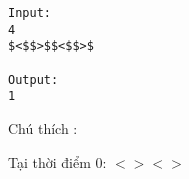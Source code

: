 \begin{verbatim}
Input:
4
$<$$>$$<$$>$

Output:
1
\end{verbatim}  Chú thích :  


  Tại thời điểm 0: $<$$>$$<$$>$